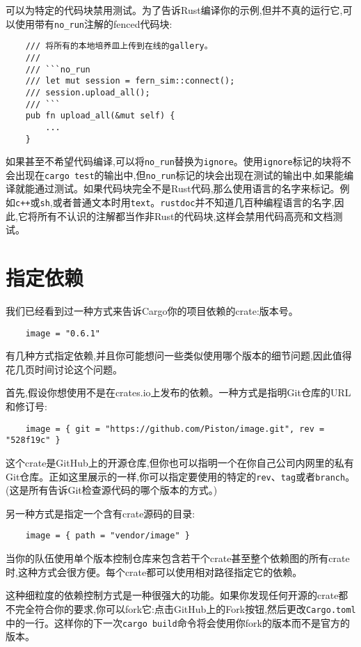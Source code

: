 可以为特定的代码块禁用测试。为了告诉Rust编译你的示例,但并不真的运行它,可以使用带有\texttt{no\_run}注解的fenced代码块:
\begin{verbatim}
    /// 将所有的本地培养皿上传到在线的gallery。
    ///
    /// ```no_run
    /// let mut session = fern_sim::connect();
    /// session.upload_all();
    /// ```
    pub fn upload_all(&mut self) {
        ...
    }
\end{verbatim}

如果甚至不希望代码编译,可以将\texttt{no\_run}替换为\texttt{ignore}。使用\texttt{ignore}标记的块将不会出现在\texttt{cargo test}的输出中,但\texttt{no\_run}标记的块会出现在测试的输出中,如果能编译就能通过测试。如果代码块完全不是Rust代码,那么使用语言的名字来标记。例如\texttt{c++}或\texttt{sh},或者普通文本时用\texttt{text}。\texttt{rustdoc}并不知道几百种编程语言的名字,因此,它将所有不认识的注解都当作非Rust的代码块,这样会禁用代码高亮和文档测试。

\section{指定依赖}\label{depend}

我们已经看到过一种方式来告诉Cargo你的项目依赖的crate:版本号。
\begin{verbatim}
    image = "0.6.1"
\end{verbatim}

有几种方式指定依赖,并且你可能想问一些类似使用哪个版本的细节问题,因此值得花几页时间讨论这个问题。

首先,假设你想使用不是在crates.io上发布的依赖。一种方式是指明Git仓库的URL和修订号:
\begin{verbatim}
    image = { git = "https://github.com/Piston/image.git", rev = "528f19c" }
\end{verbatim}

这个crate是GitHub上的开源仓库,但你也可以指明一个在你自己公司内网里的私有Git仓库。正如这里展示的一样,你可以指定要使用的特定的\texttt{rev}、\texttt{tag}或者\texttt{branch}。(这是所有告诉Git检查源代码的哪个版本的方式。)

另一种方式是指定一个含有crate源码的目录:
\begin{verbatim}
    image = { path = "vendor/image" }
\end{verbatim}

当你的队伍使用单个版本控制仓库来包含若干个crate甚至整个依赖图的所有crate时,这种方式会很方便。每个crate都可以使用相对路径指定它的依赖。

这种细粒度的依赖控制方式是一种很强大的功能。如果你发现任何开源的crate都不完全符合你的要求,你可以fork它:点击GitHub上的Fork按钮,然后更改\texttt{Cargo.toml}中的一行。这样你的下一次\texttt{cargo build}命令将会使用你fork的版本而不是官方的版本。

